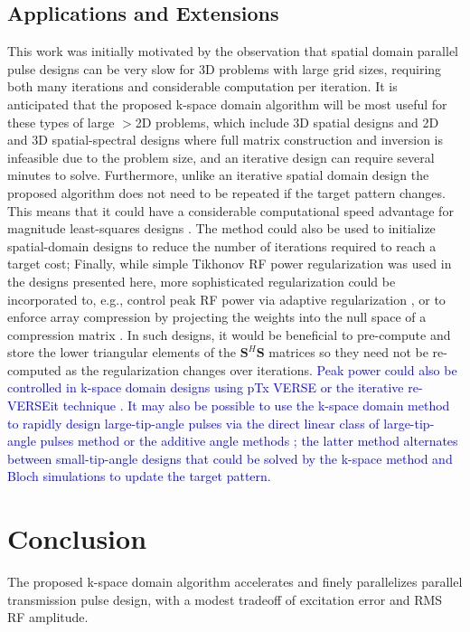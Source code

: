 \subsection*{Applications and Extensions}
This work was initially motivated by the observation that spatial domain parallel pulse designs can be very slow
for 3D problems with large grid sizes, 
requiring both many iterations and considerable computation per iteration. 
It is anticipated that the proposed k-space domain algorithm will be most useful for these types of large $>$2D problems,
which include 3D spatial designs \cite{malik2012tailored} and 2D and 3D spatial-spectral designs \cite{stenger2000three,yang2010four,davids2016fast}
where full matrix construction and inversion is infeasible due to the problem size,
and an iterative design can require several minutes to solve. 
Furthermore, unlike an iterative spatial domain design the proposed algorithm does not need to be repeated if the target pattern changes.
This means that it could have a considerable computational speed advantage for magnitude least-squares designs \cite{setsompop2008magnitude,malik:mrm:2015}. 
The method could also be used to initialize spatial-domain designs to reduce the number of iterations required to reach a target cost; 
Finally, while simple Tikhonov RF power regularization was used in the designs presented here,
more sophisticated regularization could be incorporated to, e.g., control peak RF power via adaptive regularization \cite{Yip:2005:Magn-Reson-Med:16155881},
or to enforce array compression by projecting the weights into the null space of a compression matrix \cite{cao2016array}.
In such designs, it would be beneficial to pre-compute and store the lower triangular elements of the $\bm{S}^H\bm{S}$ matrices
so they need not be re-computed as the regularization changes over iterations.  
\textcolor{blue}{Peak power could also be controlled in k-space domain designs using pTx VERSE \cite{Lee:2011:MRM} or the iterative re-VERSEit technique \cite{lee2009tod}.} 
\textcolor{blue}{It may also be possible to use the k-space domain method to rapidly design large-tip-angle pulses via the direct linear class of large-tip-angle pulses method \cite{Xu:2008aa} or the additive angle methods \cite{grissom:mrm:2008}; 
the latter method alternates between small-tip-angle designs that could be solved by the k-space method and Bloch simulations to update the target pattern.} 


\section*{Conclusion}
The proposed k-space domain algorithm accelerates and finely parallelizes parallel transmission pulse design,
with a modest tradeoff of excitation error and RMS RF amplitude.